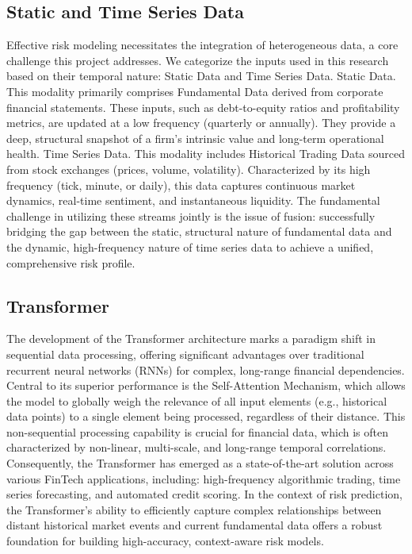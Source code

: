 \subsection{Static and Time Series Data}
Effective risk modeling necessitates the integration of heterogeneous data, a core challenge this project addresses. We categorize the inputs used in this research based on their temporal nature: Static Data and Time Series Data.
Static Data. This modality primarily comprises Fundamental Data derived from corporate financial statements. These inputs, such as debt-to-equity ratios and profitability metrics, are updated at a low frequency (quarterly or annually). They provide a deep, structural snapshot of a firm’s intrinsic value and long-term operational health.
Time Series Data. This modality includes Historical Trading Data sourced from stock exchanges (prices, volume, volatility). Characterized by its high frequency (tick, minute, or daily), this data captures continuous market dynamics, real-time sentiment, and instantaneous liquidity.
The fundamental challenge in utilizing these streams jointly is the issue of fusion: successfully bridging the gap between the static, structural nature of fundamental data and the dynamic, high-frequency nature of time series data to achieve a unified, comprehensive risk profile.

\subsection{Transformer}
The development of the Transformer architecture marks a paradigm shift in sequential data processing, offering significant advantages over traditional recurrent neural networks (RNNs) for complex, long-range financial dependencies. Central to its superior performance is the Self-Attention Mechanism, which allows the model to globally weigh the relevance of all input elements (e.g., historical data points) to a single element being processed, regardless of their distance. This non-sequential processing capability is crucial for financial data, which is often characterized by non-linear, multi-scale, and long-range temporal correlations. Consequently, the Transformer has emerged as a state-of-the-art solution across various FinTech applications, including: high-frequency algorithmic trading, time series forecasting, and automated credit scoring. In the context of risk prediction, the Transformer’s ability to efficiently capture complex relationships between distant historical market events and current fundamental data offers a robust foundation for building high-accuracy, context-aware risk models.

